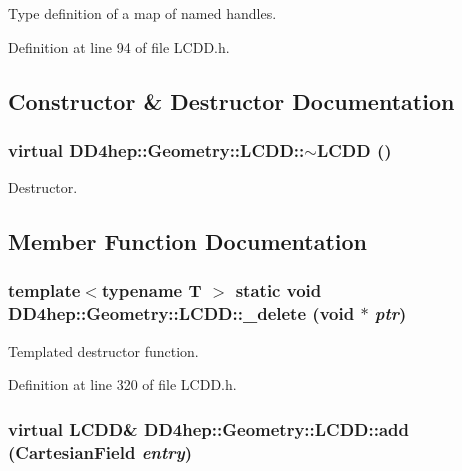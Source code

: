 Type definition of a map of named handles. 

Definition at line 94 of file LCDD.h.

\subsection{Constructor \& Destructor Documentation}
\hypertarget{class_d_d4hep_1_1_geometry_1_1_l_c_d_d_a420f99b6dbdcde67557bafb49a8c18c1}{
\subsubsection[{$\sim$LCDD}]{\setlength{\rightskip}{0pt plus 5cm}virtual DD4hep::Geometry::LCDD::$\sim$LCDD ()}}
\label{class_d_d4hep_1_1_geometry_1_1_l_c_d_d_a420f99b6dbdcde67557bafb49a8c18c1}


Destructor. 

\subsection{Member Function Documentation}
\hypertarget{class_d_d4hep_1_1_geometry_1_1_l_c_d_d_aa5ca16bda234eac32f855dfd93cf1cd3}{
\subsubsection[{\_\-delete}]{\setlength{\rightskip}{0pt plus 5cm}template$<$typename T $>$ static void DD4hep::Geometry::LCDD::\_\-delete (void $\ast$ {\em ptr})}}
\label{class_d_d4hep_1_1_geometry_1_1_l_c_d_d_aa5ca16bda234eac32f855dfd93cf1cd3}


Templated destructor function. 

Definition at line 320 of file LCDD.h.\hypertarget{class_d_d4hep_1_1_geometry_1_1_l_c_d_d_a57833b868c0abeb0d1ee43d1895a5996}{
\subsubsection[{add}]{\setlength{\rightskip}{0pt plus 5cm}virtual {\bf LCDD}\& DD4hep::Geometry::LCDD::add ({\bf CartesianField} {\em entry})}}
\label{class_d_d4hep_1_1_geometry_1_1_l_c_d_d_a57833b868c0abeb0d1ee43d1895a5996}


